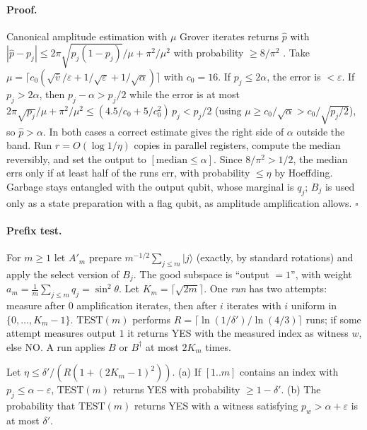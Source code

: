 \paragraph{Proof.} Canonical amplitude estimation with $\mu$ Grover iterates returns $\hat p$ with $|\hat p-p_j|\le2\pi\sqrt{p_j(1-p_j)}/\mu+\pi^2/\mu^2$ with probability $\ge8/\pi^2$ \citep{Brassard2002}. Take $\mu=\lceil c_0(\sqrt{\bar v}/\varepsilon+1/\sqrt\varepsilon+1/\sqrt\alpha)\rceil$ with $c_0=16$. If $p_j\le2\alpha$, the error is $<\varepsilon$. If $p_j>2\alpha$, then $p_j-\alpha>p_j/2$ while the error is at most $2\pi\sqrt{p_j}/\mu+\pi^2/\mu^2\le(4.5/c_0+5/c_0^2)\,p_j<p_j/2$ (using $\mu\ge c_0/\sqrt\alpha>c_0/\sqrt{p_j/2}$), so $\hat p>\alpha$. In both cases a correct estimate gives the right side of $\alpha$ outside the band. Run $r=O(\log1/\eta)$ copies in parallel registers, compute the median reversibly, and set the output to $[\text{median}\le\alpha]$. Since $8/\pi^2>1/2$, the median errs only if at least half of the runs err, with probability $\le\eta$ by Hoeffding. Garbage stays entangled with the output qubit, whose marginal is $q_j$; $B_j$ is used only as a state preparation with a flag qubit, as amplitude amplification allows. \hfill$\square$

\paragraph{Prefix test.} For $m\ge1$ let $A'_m$ prepare $m^{-1/2}\sum_{j\le m}|j\rangle$ (exactly, by standard rotations) and apply the select version of $B_j$. The good subspace is ``output $=1$'', with weight $a_m=\frac1m\sum_{j\le m}q_j=\sin^2\theta$. Let $K_m=\lceil\sqrt{2m}\rceil$. One \emph{run} has two attempts: measure after $0$ amplification iterates, then after $i$ iterates with $i$ uniform in $\{0,\dots,K_m-1\}$. $\mathrm{TEST}(m)$ performs $R=\lceil\ln(1/\delta')/\ln(4/3)\rceil$ runs; if some attempt measures output $1$ it returns YES with the measured index as witness $w$, else NO. A run applies $B$ or $B^\dagger$ at most $2K_m$ times.

\begin{lemma}\label{lem:prefix}
Let $\eta\le\delta'/(R(1+(2K_m-1)^2))$. (a) If $[1..m]$ contains an index with $p_j\le\alpha-\varepsilon$, $\mathrm{TEST}(m)$ returns YES with probability $\ge1-\delta'$. (b) The probability that $\mathrm{TEST}(m)$ returns YES with a witness satisfying $p_w>\alpha+\varepsilon$ is at most $\delta'$.
\end{lemma}
